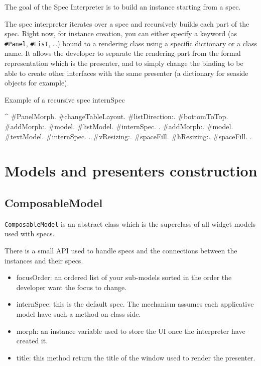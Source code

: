 \documentclass[a4paper,10pt,twoside]{book}
\begin{document}
The goal of the Spec Interpreter is to build an instance starting from a spec.

The spec interpreter iterates over a spec and recursively builds each part of the spec. Right now, for instance creation, you can either specify a keyword (as \verb+#Panel+, \verb+#List+, \dots) bound to a rendering class using a specific dictionary or a class name. It allows the developer to separate the rendering part from the formal representation which is the presenter, and to simply change the binding to be able to create other interfaces with the same presenter (a dictionary for seaside objects for example).

\begin{method}{Example of a recursive spec}
internSpec

	^	{  #PanelMorph.
			#changeTableLayout.
			#listDirection:. #bottomToTop.
			#addMorph:.   { #model. #listModel. #internSpec.	 }.
			#addMorph:.	  { #model. #textModel. #internSpec. 	}.
			#vResizing:. 	#spaceFill.
			#hResizing:. 	#spaceFill.	}.
\end{method} 



\section{Models and presenters construction}

\subsection{ComposableModel}

\verb+ComposableModel+ is an abstract class which is the superclass of all widget models used with specs.

There is a small API used to handle specs and the connections between the instances and their specs.

\begin{itemize}
	\item focusOrder: an ordered list of your sub-models sorted in the order the developer want the focus to change.
	\item internSpec: this is the default spec. The mechanism assumes each applicative model have such a method on class side.
	\item morph: an instance variable used to store the UI once the interpreter have created it.	
	\item title: this method return the title of the window used to render the presenter.
\end{itemize}
\end{document}
